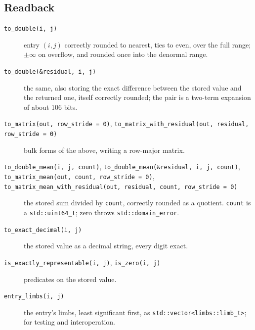 \documentclass[11pt]{article}
\newcommand{\code}[1]{\texttt{#1}}
\begin{document}
\subsection{Readback}
\begin{description}
\item[\code{to\_double(i, j)}] entry $(i, j)$ correctly rounded to nearest, ties to even, over the full range; $\pm\infty$ on overflow, and rounded once into the denormal range.
\item[\code{to\_double(\&residual, i, j)}] the same, also storing the exact difference between the stored value and the returned one, itself correctly rounded; the pair is a two-term expansion of about 106 bits.
\item[\code{to\_matrix(out, row\_stride = 0)}, \code{to\_matrix\_with\_residual(out, residual, row\_stride = 0)}] bulk forms of the above, writing a row-major matrix.
\item[\code{to\_double\_mean(i, j, count)}, \code{to\_double\_mean(\&residual, i, j, count)}, \code{to\_matrix\_mean(out, count, row\_stride = 0)}, \code{to\_matrix\_mean\_with\_residual(out, residual, count, row\_stride = 0)}] the stored sum divided by \code{count}, correctly rounded as a quotient. \code{count} is a \code{std::uint64\_t}; zero throws \code{std::domain\_error}.
\item[\code{to\_exact\_decimal(i, j)}] the stored value as a decimal string, every digit exact.
\item[\code{is\_exactly\_representable(i, j)}, \code{is\_zero(i, j)}] predicates on the stored value.
\item[\code{entry\_limbs(i, j)}] the entry's limbs, least significant first, as \code{std::vector<limbs::limb\_t>}; for testing and interoperation.
\end{description}
\end{document}
